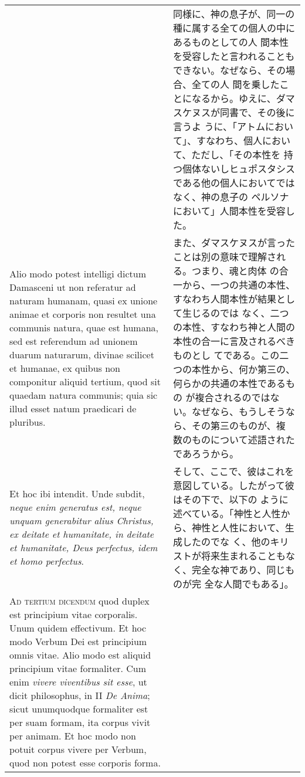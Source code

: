 \documentclass[10pt]{jsarticle} %
\begin{document}
\begin{longtable}{p{21em}p{21em}}
&

同様に、神の息子が、同一の種に属する全ての個人の中にあるものとしての人
間本性を受容したと言われることもできない。なぜなら、その場合、全ての人
間を乗したことになるから。ゆえに、ダマスケヌスが同書で、その後に言うよ
うに、「アトムにおいて」、すなわち、個人において、ただし、「その本性を
持つ個体ないしヒュポスタシスである他の個人においてではなく、神の息子の
ペルソナにおいて」人間本性を受容した。

\\


Alio modo potest intelligi dictum Damasceni ut non referatur ad
naturam humanam, quasi ex unione animae et corporis non resultet una
communis natura, quae est humana, sed est referendum ad unionem duarum
naturarum, divinae scilicet et humanae, ex quibus non componitur
aliquid tertium, quod sit quaedam natura communis; quia sic illud
esset natum praedicari de pluribus.


&

また、ダマスケヌスが言ったことは別の意味で理解される。つまり、魂と肉体
の合一から、一つの共通の本性、すなわち人間本性が結果として生じるのでは
なく、二つの本性、すなわち神と人間の本性の合一に言及されるべきものとし
てである。この二つの本性から、何か第三の、何らかの共通の本性であるもの
が複合されるのではない。なぜなら、もうしそうなら、その第三のものが、複
数のものについて述語されたであろうから。


\\


Et hoc ibi intendit. Unde subdit, {\itshape neque enim generatus est,
neque unquam generabitur alius Christus, ex deitate et humanitate, in
deitate et humanitate, Deus perfectus, idem et homo perfectus}.


&

そして、ここで、彼はこれを意図している。したがって彼はその下で、以下の
ように述べている。「神性と人性から、神性と人性において、生成したのでな
く、他のキリストが将来生まれることもなく、完全な神であり、同じものが完
全な人間でもある」。





\\



{\scshape Ad tertium dicendum} quod duplex est principium vitae
corporalis. Unum quidem effectivum. Et hoc modo Verbum Dei est
principium omnis vitae. Alio modo est aliquid principium vitae
formaliter. Cum enim {\itshape vivere viventibus sit esse}, ut dicit
philosophus, in II {\itshape De Anima}; sicut unumquodque formaliter
est per suam formam, ita corpus vivit per animam. Et hoc modo non
potuit corpus vivere per Verbum, quod non potest esse corporis forma.



\end{longtable}
\end{document}
